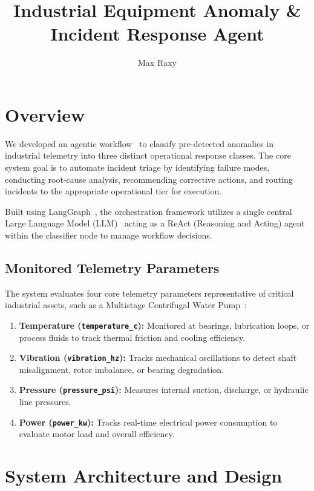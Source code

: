 \documentclass[stu, 12pt, floatsintext]{apa7}
\title{Industrial Equipment Anomaly \& Incident Response Agent}
\author{Max Raxy}
\affiliation{Udacity Institute of AI \& Technology}
\begin{document}
	\maketitle
	\tableofcontents
	\newpage
	\listoffigures%
	\listoftables%
	\newpage

\section{Overview}
We developed an agentic workflow~\parencites{agentic_Plaat_2025}{agentic_Hughes04072025} to classify pre-detected anomalies in industrial telemetry into three distinct operational response classes. The core system goal is to automate incident triage by identifying failure modes, conducting root-cause analysis, recommending corrective actions, and routing incidents to the appropriate operational tier for execution.

Built using LangGraph~\parencite{langgraph_overview_2026}, the orchestration framework utilizes a single central Large Language Model (LLM)~\parencite{enwiki:LLM} acting as a ReAct (Reasoning and Acting) agent~\parencite{react} within the classifier node to manage workflow decisions.

\subsection{Monitored Telemetry Parameters}
The system evaluates four core telemetry parameters representative of critical industrial assets, such as a Multistage Centrifugal Water Pump~\parencite{enwiki:cent-pump}:
\begin{enumerate}[font=\large\color{red}]
	\item \textbf{Temperature (\texttt{temperature\_c}):} Monitored at bearings, lubrication loops, or process fluids to track thermal friction and cooling efficiency.
	\item \textbf{Vibration (\texttt{vibration\_hz}):} Tracks mechanical oscillations to detect shaft misalignment, rotor imbalance, or bearing degradation.
	\item \textbf{Pressure (\texttt{pressure\_psi}):} Measures internal suction, discharge, or hydraulic line pressures.
	\item \textbf{Power (\texttt{power\_kw}):} Tracks real-time electrical power consumption to evaluate motor load and overall efficiency.
\end{enumerate}


\section{System Architecture and Design}
\end{document}
